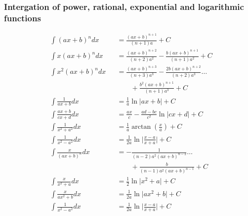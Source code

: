 \subsubsection{Intergation of power, rational, exponential and logarithmic functions}
\begin{footnotesize}
    \begin{align*}
         & \int {(ax+b)}^n dx                    &  & =\frac{{(ax+b)}^{n+1}}{(n+1)a}+C                                                  \\
         & \int x{(ax+b)}^n dx                   &  & =\frac{{(ax+b)}^{n+2}}{(n+2)a^2}-\frac{b{(ax+b)}^{n+1}}{(n+1)a^2}+C               \\
         & \int x^2{(ax+b)}^n dx                 &  & =\frac{{(ax+b)}^{n+3}}{(n+3)a^3}-\frac{2b{(ax+b)}^{n+2}}{(n+2)a^3} \dots          \\
         &                                       &  & \qquad +\frac{b^2{(ax+b)}^{n+1}}{(n+1)a^3}+C                                      \\
         & \int \frac{1}{ax+b}dx                 &  & =\frac{1}{a}\ln\vert ax+b \vert +C                                                \\
         & \int \frac{ax+b}{cx+d}dx              &  & =\frac{ax}{c}-\frac{ad-bc}{c^2}\ln\vert cx+d \vert +C                             \\
         & \int \frac{1}{x^2+a^2}dx              &  & =\frac{1}{a}\arctan\left(\frac{x}{a}\right) +C                                    \\
         & \int \frac{1}{x^2-a^2}dx              &  & =\frac{1}{2a}\ln\big\vert \frac{x-a}{x+a}\big\vert +C                             \\
         & \int \frac{x}{{(ax+b)}^n}dx           &  & =-\frac{1}{(n-2)a^2{(ax+b)}^{n-2}} \dots                                          \\
         &                                       &  & \qquad +\frac{b}{(n-1)a^2{(ax+b)}^{n-1}}+C                                        \\
         & \int \frac{x}{x^2+a}dx                &  & =\frac{1}{2}\ln\vert x^2+a \vert+C                                                \\
         & \int \frac{x}{ax^2+b}dx               &  & =\frac{1}{2a}\ln \vert ax^2+b \vert+C                                             \\
         & \int \frac{1}{x^2-a^2}dx              &  & =\frac{1}{2a}\ln \vert \frac{x-a}{x+a}\vert+C                                     \\

\end{align*}
\end{footnotesize}
